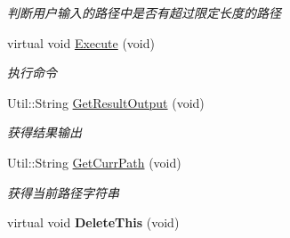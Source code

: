 \begin{DoxyCompactItemize}
\begin{DoxyCompactList}\small\item\em 判断用户输入的路径中是否有超过限定长度的路径 \end{DoxyCompactList}\item 
virtual void \hyperlink{class_command_sys_1_1_console_command_a1d63e6780d3cfe83cc3452b0d797324c}{Execute} (void)
\begin{DoxyCompactList}\small\item\em 执行命令 \end{DoxyCompactList}\item 
\hypertarget{class_command_sys_1_1_console_command_a380826ec9a19599d809966ae6ba3e70d}{Util\-::\-String \hyperlink{class_command_sys_1_1_console_command_a380826ec9a19599d809966ae6ba3e70d}{Get\-Result\-Output} (void)}\label{class_command_sys_1_1_console_command_a380826ec9a19599d809966ae6ba3e70d}

\begin{DoxyCompactList}\small\item\em 获得结果输出 \end{DoxyCompactList}\item 
\hypertarget{class_command_sys_1_1_console_command_a74acff251b68f7f1d7385a88ed4ad0b2}{Util\-::\-String \hyperlink{class_command_sys_1_1_console_command_a74acff251b68f7f1d7385a88ed4ad0b2}{Get\-Curr\-Path} (void)}\label{class_command_sys_1_1_console_command_a74acff251b68f7f1d7385a88ed4ad0b2}

\begin{DoxyCompactList}\small\item\em 获得当前路径字符串 \end{DoxyCompactList}\item 
\hypertarget{class_command_sys_1_1_console_command_a64da8f9370c53e11065885cae8c4140a}{virtual void {\bfseries Delete\-This} (void)}\label{class_command_sys_1_1_console_command_a64da8f9370c53e11065885cae8c4140a}

\end{DoxyCompactItemize}
